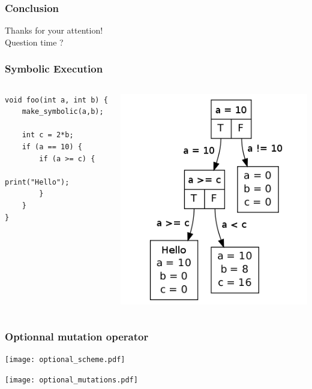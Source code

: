 \begin{frame}
    \frametitle{Conclusion}
    \begin{center}
        Thanks for your attention!\\
        Question time ?
    \end{center}
\end{frame}

\begin{frame}[fragile]
    \frametitle{Symbolic Execution}
    \begin{columns}[c]
        \begin{lstlisting}
void foo(int a, int b) {
    make_symbolic(a,b);

    int c = 2*b;
    if (a == 10) {
        if (a >= c) {
            print("Hello");
        }
    }
}
        \end{lstlisting}
        \includegraphics[scale=0.5]{klee_concolic_graph}
    \end{columns}
\end{frame}

\begin{frame} \frametitle{Optionnal mutation operator}
\vfill
\begin{center}
\texttt{[image: optional\_scheme.pdf]}
\end{center}
\vfill
\begin{center}
\vspace*{-.5cm}
\texttt{[image: optional\_mutations.pdf]}
\end{center} 
\vfill
\end{frame}
